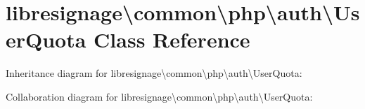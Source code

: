 \hypertarget{classlibresignage_1_1common_1_1php_1_1auth_1_1UserQuota}{}\section{libresignage\textbackslash{}common\textbackslash{}php\textbackslash{}auth\textbackslash{}User\+Quota Class Reference}
\label{classlibresignage_1_1common_1_1php_1_1auth_1_1UserQuota}


Inheritance diagram for libresignage\textbackslash{}common\textbackslash{}php\textbackslash{}auth\textbackslash{}User\+Quota\+:


Collaboration diagram for libresignage\textbackslash{}common\textbackslash{}php\textbackslash{}auth\textbackslash{}User\+Quota\+:
